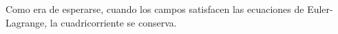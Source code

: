Como era de esperarse, cuando los campos satisfacen las ecuaciones de Euler-Lagrange, la cuadricorriente se conserva.




